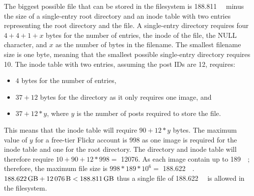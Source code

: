 The biggest possible file that can be stored in the filesystem is \SI{188.811}{\giga\byte} minus the size of a \mbox{single-entry} root directory and an inode table with two entries representing the root directory and the file. A \mbox{single-entry} directory requires four $4 + 4 + 1 + x$ bytes for the number of entries, the inode of the file, the NULL character, and $x$ as the number of bytes in the filename. The smallest filename size is one byte, meaning that the smallest possible \mbox{single-entry} directory requires \SI[per-mode = symbol]{10}{\byte}. The inode table with two entries, assuming the post IDs are \SI[per-mode = symbol]{12}{\byte}, requires:
\begin{itemize}
	\item $4$ bytes for the number of entries,
	\item $37 + 12$ bytes for the directory as it only requires one image, and
	\item $37 + 12 * y$, where $y$ is the number of posts required to store the file.
\end{itemize}
This means that the inode table will require $90 + 12 * y$ bytes. The maximum value of $y$ for a \mbox{free-tier} Flickr account is $998$ as one image is required for the inode table and one for the root directory. The directory and inode table will therefore require $10 + 90 + 12 * 998 =$ \SI[per-mode = symbol]{12076}{\byte}. As each image contain up to \SI[per-mode = symbol]{189}{\mega\byte}; therefore, the maximum file size is $998 * 189*10^6 =$ \SI[per-mode = symbol]{188.622}{\giga\byte}. $\text{\SI[per-mode = symbol]{188.622}{\giga\byte}} + \text{\SI[per-mode = symbol]{12\,076}{\byte}} < \SI{188.811}{\giga\byte}$ thus a single file of \SI[per-mode = symbol]{188.622}{\giga\byte} is allowed in the filesystem.


